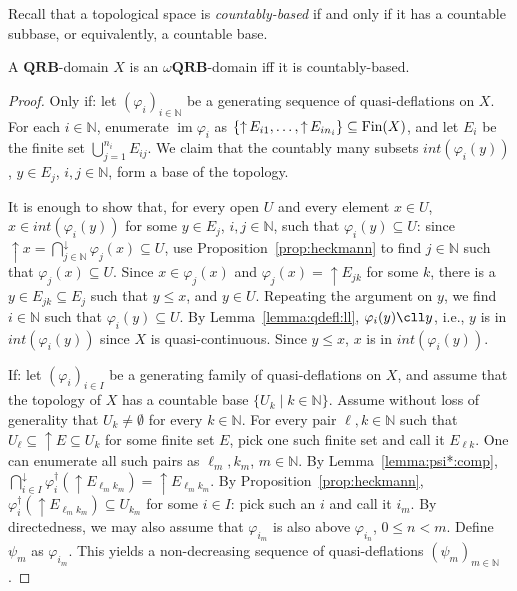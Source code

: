\documentclass{LMCS}
\newcommand\nat{\mathbb{N}}
\newcommand\img{\mathop{\mathrm{im}}}
\newcommand\upc{\mathop{\uparrow}\nolimits}
\newcommand{\interior}[1]{int ({#1})} \newcommand{\biginterior}[1]{\interior{#1}}
\newcommand\QRB{\mathbf{QRB}}
\begin{document}
Recall that a topological space is \emph{countably-based} if and only
if it has a countable subbase, or equivalently, a countable base.
\begin{prop}
  \label{prop:omega:qrb:2}
  A $\QRB$-domain $X$ is an $\omega\QRB$-domain iff it is
  countably-based.
\end{prop}
\begin{proof}
  Only if: let ${(\varphi_i)}_{i \in \nat}$ be a generating sequence
  of quasi-deflations on $X$.  For each $i \in \nat$, enumerate $\img
  \varphi_i$ as $\{\upc E_{i1}, \ldots, \upc E_{in_i}\} \subseteq \Fin
  (X)$, and let $E_i$ be the finite set $\bigcup_{j=1}^{n_i} E_{ij}$.
  We claim that the countably many subsets $\interior {\varphi_i
    (y)}$, $y \in E_j$, $i, j \in \nat$, form a base of the topology.

  It is enough to show that, for every open $U$ and every element $x
  \in U$, $x \in \interior {\varphi_i (y)}$ for some $y \in E_j$, $i,
  j\in \nat$, such that $\varphi_i (y) \subseteq U$: since $\upc x =
  \bigcap_{j \in \nat}^\downarrow \varphi_j (x) \subseteq U$, use
  Proposition~\ref{prop:heckmann} to find $j \in \nat$ such that
  $\varphi_j (x) \subseteq U$.  Since $x \in \varphi_j (x)$ and
  $\varphi_j (x) = \upc E_{jk}$ for some $k$, there is a $y \in E_{jk}
  \subseteq E_j$ such that $y \leq x$, and $y \in U$.  Repeating the
  argument on $y$, we find $i \in \nat$ such that $\varphi_i (y)
  \subseteq U$.  By Lemma~\ref{lemma:qdefl:ll}, $\varphi_i (y) \cll
  y$, i.e., $y$ is in $\interior {\varphi_i (y)}$ since $X$ is
  quasi-continuous.  Since $y \leq x$, $x$ is in $\interior {\varphi_i
    (y)}$.

  If: let ${(\varphi_i)}_{i \in I}$ be a generating family of
  quasi-deflations on $X$, and assume that the topology of $X$ has a
  countable base $\{U_k \mid k\in \nat\}$.  Assume without loss of
  generality that $U_k \neq \emptyset$ for every $k \in \nat$.  For
  every pair $\ell, k \in \nat$ such that $U_\ell \subseteq \upc E
  \subseteq U_k$ for some finite set $E$, pick one such finite set and
  call it $E_{\ell k}$.  One can enumerate all such pairs as $\ell_m,
  k_m$, $m \in \nat$.  By Lemma~\ref{lemma:psi*:comp}, $\bigcap_{i \in
    I}^\downarrow \varphi_i^\dagger (\upc E_{\ell_m k_m}) = \upc
  E_{\ell_m k_m}$.  By Proposition~\ref{prop:heckmann},
  $\varphi_i^\dagger (\upc E_{\ell_m k_m}) \subseteq U_{k_m}$ for some
  $i \in I$: pick such an $i$ and call it $i_m$.  By directedness, we
  may also assume that $\varphi_{i_m}$ is also above $\varphi_{i_n}$,
  $0 \leq n < m$.  Define $\psi_m$ as $\varphi_{i_m}$.  This yields a
  non-decreasing sequence of quasi-deflations ${(\psi_m)}_{m \in
    \nat}$.


\end{proof}
\end{document}
